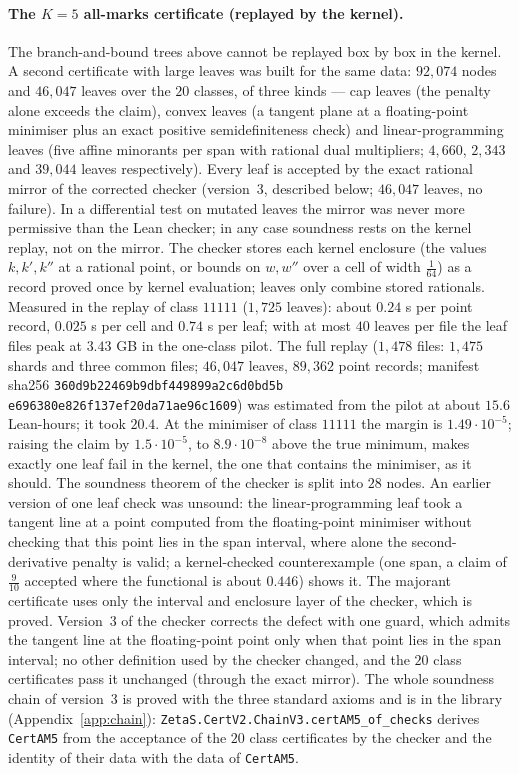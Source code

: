 \paragraph{The $K=5$ all-marks certificate (replayed by the kernel).} The branch-and-bound trees above cannot be replayed box by box in the kernel. A second
certificate with large leaves was built for the same data: $92{,}074$ nodes and $46{,}047$ leaves over the $20$ classes, of three kinds --- cap
leaves (the penalty alone exceeds the claim), convex leaves (a tangent plane at a floating-point minimiser plus an exact positive semidefiniteness
check) and linear-programming leaves (five affine minorants per span with rational dual multipliers; $4{,}660$, $2{,}343$ and $39{,}044$ leaves
respectively). Every leaf is accepted by the exact rational mirror of the corrected checker (version~3, described below; $46{,}047$ leaves,
no failure). In a differential test on mutated leaves the mirror was never more permissive than the Lean checker; in any case soundness
rests on the kernel replay, not on the mirror. The checker stores each kernel enclosure (the values
$k,k',k''$ at a rational point, or bounds on $w,w''$ over a cell of width $\frac1{64}$) as a record proved once by kernel evaluation; leaves only
combine stored rationals. Measured in the replay of class $11111$ ($1{,}725$ leaves): about $0.24$ s per point record, $0.025$ s per cell and
$0.74$ s per leaf; with at most $40$ leaves per file the leaf files peak at $3.43$ GB in the one-class pilot. The full replay ($1{,}478$ files: $1{,}475$ shards and
three common files; $46{,}047$ leaves, $89{,}362$ point records; manifest sha256 \texttt{360d9b22469b9dbf449899a2c6d0bd5b}\allowbreak
\texttt{e696380e826f137ef20da71ae96c1609}) was estimated from the pilot at about $15.6$ Lean-hours; it took $20.4$. At the minimiser of class $11111$ the margin is $1.49\cdot10^{-5}$; raising
the claim by $1.5\cdot10^{-5}$, to $8.9\cdot10^{-8}$ above the true minimum, makes exactly one leaf fail in the kernel, the one that contains
the minimiser, as it should.
The soundness theorem of the checker is split into $28$ nodes. An earlier version of one leaf check was unsound: the linear-programming leaf
took a tangent line at a point computed from the floating-point minimiser without checking that this point lies in the span interval, where
alone the second-derivative penalty is valid; a kernel-checked counterexample (one span, a claim of $\frac9{10}$ accepted where the functional
is about $0.446$) shows it. The majorant certificate uses only the interval and enclosure layer of the checker, which is proved.
Version~3 of the checker corrects the defect with one guard, which admits the tangent line at the floating-point point only when that point
lies in the span interval; no other definition used by the checker changed, and the $20$ class certificates pass it unchanged (through the exact mirror).
The whole soundness chain of version~3 is proved with the three standard axioms and is in the library (Appendix~\ref{app:chain}):
\texttt{ZetaS.CertV2.\allowbreak ChainV3.\allowbreak certAM5\_of\_checks} derives \texttt{CertAM5} from the acceptance of the $20$ class certificates by the checker
and the identity of their data with the data of \texttt{CertAM5}.

